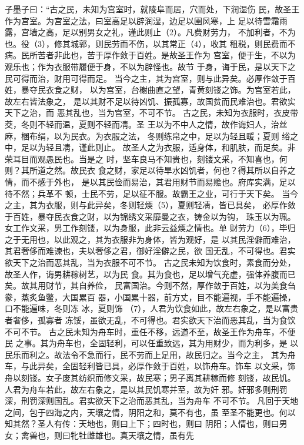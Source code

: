 \documentclass[12pt,UTF8]{ctexbook}
\begin{document}
子墨子曰：“古之民，未知为宫室时，就陵阜而居，穴而处，下润湿伤 
民，故圣王作为宫室。为宫室之法，曰室高足以辟润湿，边足以圉风寒，上 
足以待雪霜雨露，宫墙之高，足以别男女之礼，谨此则止（2）。凡费财劳力， 
不加利者，不为也。役（3），修其城郭，则民劳而不伤，以其常正（4），收其 
租税，则民费而不病。民所苦者非此也，苦于厚作敛于百姓。是故圣王作为 
宫室，便于生，不以为观乐也；作为衣服带履便于身，不以为辟怪也。故节 
于身，诲于民，是以天下之民可得而治，财用可得而足。 
当今之主，其为宫室，则与此异矣。必厚作敛于百姓，暴夺民衣食之财， 
以为宫室，台榭曲直之望，青黄刻镂之饰。为宫室若此，故左右皆法象之， 
是以其财不足以待凶饥、振孤寡，故国贫而民难治也。君欲实天下之治，而 
恶其乱也，当为宫室，不可不节。 
古之民，未知为衣服时，衣皮带茭，冬则不轻而温，夏则不轻而凊。圣 
王以为不中人之情，故作诲妇人，治丝麻，棞布绢，以为民衣。为衣服之法， 
冬则练帛之中，足以为轻且暖；夏则 绤之中，足以为轻且凊，谨此则止。 
故圣人之为衣服，适身体，和肌肤，而足矣。非荣耳目而观愚民也。当是之 
时，坚车良马不知贵也，刻镂文采，不知喜也，何则？其所道之然。故民衣 
食之财，家足以待旱水凶饥者，何也？得其所以自养之情，而不感于外也， 
是以其民俭而易治，其君用财节而易赡也。府库实满，足以待不然；兵革不 
顿，士民不劳，足以征不服。故霸王之业，可行于天下矣。 
当今之主，其为衣服，则与此异矣，冬则轻煗（5），夏则轻凊，皆已具矣， 
必厚作敛于百姓，暴夺民衣食之财，以为锦绣文采靡曼之衣，铸金以为钩， 
珠玉以为珮。女工作文采，男工作刻镂，以为身服，此非云益煗之情也。单 
财劳力（6），毕归之于无用也，以此观之，其为衣服非为身体，皆为观好，是 
以其民淫僻而难治，其君奢侈而难谏也，夫以奢侈之君，御好淫僻之民，欲 
国无乱，不可得也。君实欲天下之治而恶其乱，当为衣服不可不节。 
古之民未知为饮食时，素食而分处，故圣人作，诲男耕稼树艺，以为民 
食。其为食也，足以增气充虚，强体养腹而已矣。故其用财节，其自养俭， 
民富国治。今则不然，厚作敛于百姓，以为美食刍豢，蒸炙鱼鳖，大国累百 
器，小国累十器，前方丈，目不能遍视，手不能遍操，口不能遍味，冬则冻 
冰，夏则饰 （7），人君为饮食如此，故左右象之，是以富贵者奢侈，孤寡者 
冻馁，虽欲无乱，不可得也。君实欲天下治而恶其乱，当为食饮不可不节。 
古之民未知为舟车时，重任不移，远道不至，故圣王作为舟车，不便民 
之事。其为舟车也，全固轻利，可以任重致远，其为用财少，而为利多，是 
以民乐而利之。故法令不急而行，民不劳而上足用，故民归之。当今之主， 
其为舟车，与此异矣，全固轻利皆已具，必厚作敛于百姓，以饰舟车。饰车 
以文采，饰舟以刻镂。女子废其纺织而修文采，故民寒；男子离其耕稼而修 
刻镂，故民饥。人君为舟车若此，故左右象之，是以其民饥寒并至，故为奸 
邪。奸邪多则刑罚深，刑罚深则国乱。君实欲天下之治而恶其乱，当为舟车 
不可不节。 
凡回于天地之间，包于四海之内，天壤之情，阴阳之和，莫不有也，虽 
至圣不能更也。何以知其然？圣人有传：天地也，则曰上下；四时也，则曰 
阴阳；人情也，则曰男女；禽兽也，则曰牝牡雌雄也。真天壤之情，虽有先 
\end{document}
